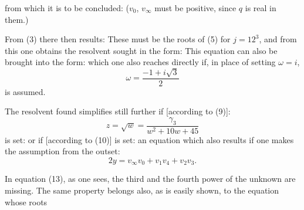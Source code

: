 from which it is to be concluded:
($v_0$, $v_\infty$ must be positive, since $q$ is real in them.)

From (3) there then results:
These must be the roots of (5) for $j=12^3$, and from this one obtains the resolvent sought in the form:
This equation can also be brought into the form:
which one also reaches directly if, in place of setting $\omega=i$,
\[ \omega = \frac{-1+i\sqrt3}{2} \]
is assumed.

The resolvent found simplifies still further if [according to (9)]:
\[ z = \sqrt{w} = \frac{\gamma_3}{w^2+10w+45} \]
is set:
or if [according to (10)]
is set:
an equation which also results if one makes the assumption from the outset:
\[ 2y = v_\infty v_0 + v_1 v_4 + v_2 v_3. \]

In equation (13), as one sees, the third and the fourth power of the unknown are missing. The same property belongs also, as is easily shown, to the equation whose roots
